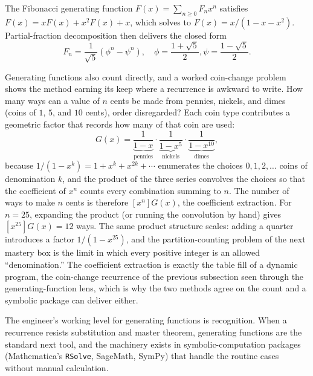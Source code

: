 The Fibonacci generating function $F(x) = \sum_{n \geq 0} F_{n}
x^{n}$ satisfies $F(x) = x F(x) + x^{2} F(x) + x$, which solves to
$F(x) = x / (1 - x - x^{2})$. Partial-fraction decomposition then
delivers the closed form
\[
F_{n} = \frac{1}{\sqrt{5}} \left( \phi^{n} - \psi^{n} \right),
\quad \phi = \frac{1 + \sqrt{5}}{2}, \psi = \frac{1 - \sqrt{5}}{2}.
\]

Generating functions also count directly, and a worked coin-change
problem shows the method earning its keep where a recurrence is
awkward to write. How many ways can a value of $n$ cents be made
from pennies, nickels, and dimes (coins of $1$, $5$, and $10$
cents), order disregarded? Each coin type contributes a geometric
factor that records how many of that coin are used:
\[
G(x) = \underbrace{\frac{1}{1 - x}}_{\text{pennies}}
\cdot
\underbrace{\frac{1}{1 - x^{5}}}_{\text{nickels}}
\cdot
\underbrace{\frac{1}{1 - x^{10}}}_{\text{dimes}},
\]
because $1/(1 - x^{k}) = 1 + x^{k} + x^{2k} + \cdots$ enumerates the
choices $0, 1, 2, \ldots$ coins of denomination $k$, and the product
of the three series convolves the choices so that the coefficient of
$x^{n}$ counts every combination summing to $n$. The number of ways
to make $n$ cents is therefore $[x^{n}] G(x)$, the coefficient
extraction. For $n = 25$, expanding the product (or running the
convolution by hand) gives $[x^{25}] G(x) = 12$ ways. The same
product structure scales: adding a quarter introduces a factor
$1/(1 - x^{25})$, and the partition-counting problem of the next
mastery box is the limit in which every positive integer is an
allowed ``denomination.'' The coefficient extraction is exactly the
table fill of a dynamic program, the coin-change recurrence of the
previous subsection seen through the generating-function lens, which
is why the two methods agree on the count and a symbolic package can
deliver either.

The engineer's working level for generating functions is
recognition. When a recurrence resists substitution and master
theorem, generating functions are the standard next tool, and the
machinery exists in symbolic-computation packages (Mathematica's
\texttt{RSolve}, SageMath, SymPy) that handle the routine cases
without manual calculation.

